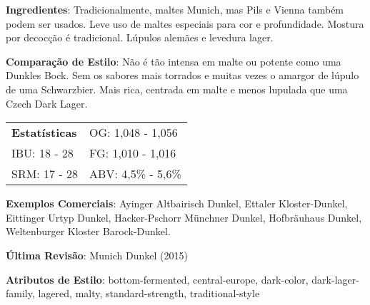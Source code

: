 \textbf{Ingredientes}: Tradicionalmente, maltes Munich, mas Pils e Vienna também podem ser usados. Leve uso de maltes especiais para cor e profundidade. Mostura por decocção é tradicional. Lúpulos alemães e levedura lager.

\textbf{Comparação de Estilo}: Não é tão intensa em malte ou potente como uma Dunkles Bock. Sem os sabores mais torrados e muitas vezes o amargor de lúpulo de uma Schwarzbier. Mais rica, centrada em malte e menos lupulada que uma Czech Dark Lager.

\begin{tabular}{@{}p{35mm}p{35mm}@{}}
  \textbf{Estatísticas} & OG: 1,048 - 1,056 \\
  IBU: 18 - 28 & FG: 1,010 - 1,016 \\
  SRM: 17 - 28 & ABV: 4,5\% - 5,6\%
\end{tabular}

\textbf{Exemplos Comerciais}: Ayinger Altbairisch Dunkel, Ettaler Kloster-Dunkel, Eittinger Urtyp Dunkel, Hacker-Pschorr Münchner Dunkel, Hofbräuhaus Dunkel, Weltenburger Kloster Barock-Dunkel.

\textbf{Última Revisão}: Munich Dunkel (2015)

\textbf{Atributos de Estilo}: bottom-fermented, central-europe, dark-color, dark-lager-family, lagered, malty, standard-strength, traditional-style
